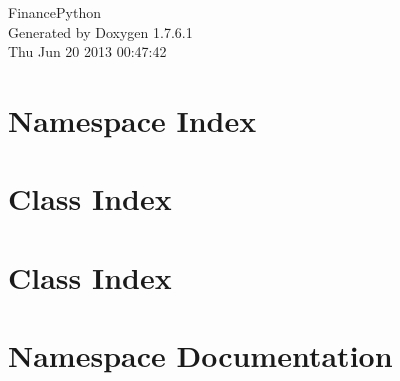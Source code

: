 \documentclass[a4paper]{book}
\begin{document}
\hypersetup{pageanchor=false,citecolor=blue}
\begin{titlepage}
\vspace*{7cm}
\begin{center}
{\Large \-Finance\-Python }\\
\vspace*{1cm}
{\large \-Generated by Doxygen 1.7.6.1}\\
\vspace*{0.5cm}
{\small Thu Jun 20 2013 00:47:42}\\
\end{center}
\end{titlepage}
\clearemptydoublepage
{}
\tableofcontents
\clearemptydoublepage
{}
\hypersetup{pageanchor=true,citecolor=blue}
\chapter{\-Namespace \-Index}

\chapter{\-Class \-Index}

\chapter{\-Class \-Index}

\chapter{\-Namespace \-Documentation}








\end{document}
